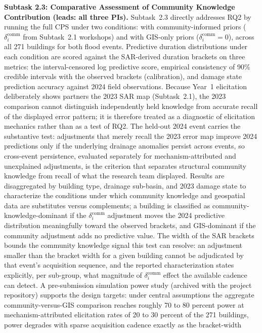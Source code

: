 \documentclass[11pt]{article}
\begin{document}
\textbf{Subtask 2.3: Comparative Assessment of Community Knowledge Contribution
(leads: all three PIs).}
Subtask~2.3 directly addresses RQ2 by running the full CPS under two conditions:
with community-informed priors ($\delta_i^{\mathrm{comm}}$ from Subtask~2.1
workshops) and with GIS-only priors ($\delta_i^{\mathrm{comm}} = 0$), across
all 271 buildings for both flood events.
Predictive duration distributions under each condition are scored against the
SAR-derived duration brackets on three metrics: the interval-censored log
predictive score, empirical consistency of 90\% credible intervals with the
observed brackets (calibration), and damage state prediction
accuracy against 2024 field observations.
Because Year~1 elicitation deliberately shows partners the 2023 SAR map
(Subtask~2.1), the 2023 comparison cannot distinguish independently held
knowledge from accurate recall of the displayed error pattern; it is therefore
treated as a diagnostic of elicitation mechanics rather than as a test of RQ2.
The held-out 2024 event carries the substantive test: adjustments that merely
recall the 2023 error map improve 2024 predictions only if the underlying
drainage anomalies persist across events, so cross-event persistence, evaluated
separately for mechanism-attributed and unexplained adjustments, is the
criterion that separates structural community knowledge from recall of what the
research team displayed.
Results are disaggregated by building type, drainage sub-basin, and 2023 damage
state to characterize the conditions under which community knowledge and geospatial
data are substitutes versus complements; a building is classified as
community-knowledge-dominant if the $\delta_i^{\mathrm{comm}}$ adjustment moves
the 2024 predictive distribution meaningfully toward the observed brackets, and
GIS-dominant if the community adjustment adds no predictive value.
The width of the SAR brackets bounds the community knowledge signal this test
can resolve: an adjustment smaller than the bracket width for a given building
cannot be adjudicated by that event's acquisition sequence, and the reported
characterization states explicitly, per sub-group, what magnitude of
$\delta_i^{\mathrm{comm}}$ effect the available cadence can detect.
A pre-submission simulation power study (archived with the project repository)
supports the design targets: under central assumptions the aggregate
community-versus-GIS comparison reaches roughly 70 to 80 percent power at
mechanism-attributed elicitation rates of 20 to 30 percent of the 271 buildings,
power degrades with sparse acquisition cadence exactly as the bracket-width
\end{document}
